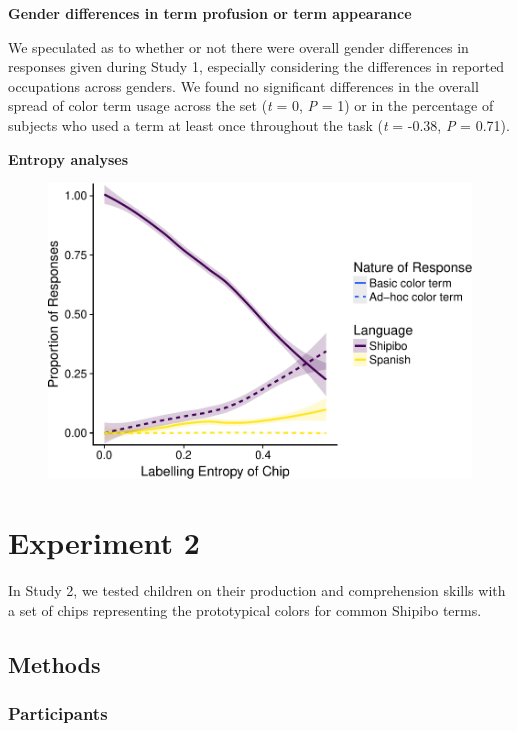 \documentclass[man]{apa6}
\theoremstyle{definition}
\theoremstyle{definition}
\theoremstyle{definition}
\theoremstyle{remark}
\begin{document}
\textbf{Gender differences in term profusion or term appearance}

We speculated as to whether or not there were overall gender differences
in responses given during Study 1, especially considering the
differences in reported occupations across genders. We found no
significant differences in the overall spread of color term usage across
the set (\emph{t} = 0, \emph{P} = 1) or in the percentage of subjects
who used a term at least once throughout the task (\emph{t} = -0.38,
\emph{P} = 0.71).

\textbf{Entropy analyses}

\begin{figure}
\centering
\includegraphics{amazon_color_files/figure-latex/study1_entropyanalyses-1.pdf}
\caption{}
\end{figure}

\section{Experiment 2}\label{experiment-2}

In Study 2, we tested children on their production and comprehension
skills with a set of chips representing the prototypical colors for
common Shipibo terms.

\subsection{Methods}\label{methods-1}

\subsubsection{Participants}\label{participants-1}
\end{document}
